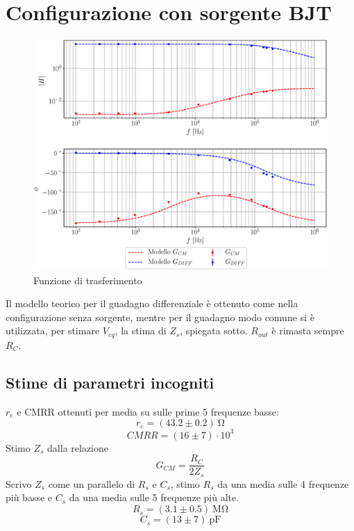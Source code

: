 \documentclass{article}
\begin{document}
\section*{Configurazione con sorgente BJT}
\begin{figure}[h!]
    \centering
    \includegraphics[scale = 0.6]{Grafici/sorgente.eps}
    \caption{Funzione di trasferimento}
    \label{fig:resistenza}
\end{figure}
Il modello teorico per il guadagno differenziale è ottenuto come nella configurazione senza sorgente, mentre per il guadagno modo comune si è utilizzata, per stimare $V_{eq}$, la stima di $Z_s$, spiegata sotto. $R_{out}$ è rimasta sempre $R_C$.

\subsection*{Stime di parametri incogniti}
$r_e$ e CMRR ottenuti per media su sulle prime 5 frequenze basse:
$$ r_e = (43.2\pm 0.2)~\si{\ohm}$$
$$ CMRR = (16\pm7)\cdot 10^{3}$$
Stimo $Z_s$ dalla relazione $$G_{CM} = \frac{R_C}{2 Z_s}$$
Scrivo $Z_s$ come un parallelo di $R_s$ e $C_s$, stimo $R_s$ da una media sulle 4 frequenze più basse e $C_s$ da una media sulle 5 frequenze più alte.
$$ R_s = (3.1\pm0.5)~\si{\mega\ohm}$$
$$C_s = (13\pm7)~\si{\pico\farad}$$
\end{document}
